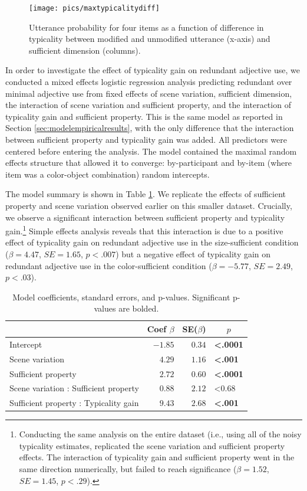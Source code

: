\documentclass[11pt]{article}
\newcommand{\tableref}[1]{Table \ref{#1}}
\newcommand{\sectionref}[1]{Section \ref{#1}}
\begin{document}
\begin{figure}
\centering
\texttt{[image: pics/maxtypicalitydiff]}
\caption{Utterance probability for four items as a function of difference in typicality between modified and unmodified utterance (x-axis) and sufficient dimension (columns). }
\label{fig:maxtypicalitydiff}
\end{figure}

In order to investigate the effect of typicality gain on redundant adjective use, we conducted a mixed effects logistic regression analysis predicting redundant over minimal adjective use from fixed effects of scene variation, sufficient dimension, the interaction of scene variation and sufficient property, and the interaction of typicality gain and sufficient property. This is the same model as reported in \sectionref{sec:modelempiricalresults}, with the only difference that the interaction between sufficient property and typicality gain was added. All predictors were centered before entering the analysis. The model contained the maximal random effects structure that allowed it to converge: by-participant and by-item (where item was a color-object combination) random intercepts. 

The model summary is shown in \tableref{tab:colortypicalityresults}. We replicate the effects of sufficient property and scene variation observed earlier on this smaller dataset. Crucially, we observe a significant interaction between sufficient property and typicality gain.\footnote{Conducting the same analysis on the entire dataset (i.e., using all of the noisy typicality estimates, replicated the scene variation and sufficient property effects. The interaction of typicality gain and sufficient property went in the same direction numerically, but failed to reach significance ($\beta = 1.52$, $SE = 1.45$, $p < .29$).} Simple effects analysis reveals that this interaction is due to a positive effect of typicality gain on redundant adjective use in the size-sufficient condition ($\beta = 4.47$, $SE = 1.65$, $p < .007$) but a negative effect of typicality gain on redundant adjective use in the color-sufficient condition  ($\beta = -5.77$, $SE = 2.49$, $p < .03$). 

\begin{table}[!tbp]
\caption{Model coefficients, standard errors, and p-values. Significant p-values are bolded.}
\begin{center}
\begin{tabular}{lrrl}
\toprule
\multicolumn{1}{l}{}&\multicolumn{1}{c}{Coef $\beta$}&\multicolumn{1}{c}{SE($\beta$)}&\multicolumn{1}{c}{$p$}\tabularnewline
\midrule
Intercept&$-1.85$&$0.34$&\textbf{\textless .0001}\tabularnewline
Scene variation&$ 4.29$&$1.16$&\textbf{\textless .001}\tabularnewline
Sufficient property&$ 2.72$&$0.60$&\textbf{\textless .0001}\tabularnewline
Scene variation : Sufficient property&$ 0.88$&$2.12$&\textless 0.68\tabularnewline
Sufficient property : Typicality gain&$ 9.43$&$2.68$&\textbf{\textless .001}\tabularnewline
\bottomrule
\end{tabular}\end{center}
\label{tab:colortypicalityresults}
\end{table}
\end{document}
